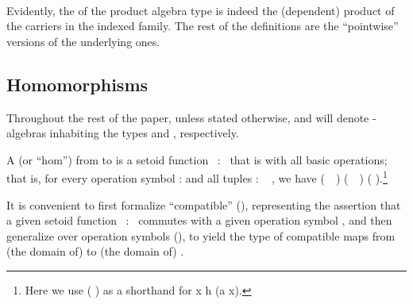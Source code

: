 \begin{code}
\AgdaSymbol{))}\AgdaSpace{}%
\AgdaSymbol{(}\AgdaSpace{}%
\AgdaOperator{\AgdaInductiveConstructor{,}}\AgdaSpace{}%
\AgdaSpace{}%
\AgdaSymbol{)}\AgdaSpace{}%
\AgdaSymbol{=}\AgdaSpace{}%
\AgdaSpace{}%
\AgdaSpace{}%
\AgdaSpace{}%
\AgdaSpace{}%
\AgdaSymbol{(}\AgdaSpace{}%
\AgdaSymbol{(}\AgdaSpace{}%
\AgdaSymbol{))}\AgdaSpace{}%
\AgdaSymbol{(}\AgdaSpace{}%
\AgdaOperator{\AgdaInductiveConstructor{,}}\AgdaSpace{}%
\AgdaSpace{}%
\AgdaSpace{}%
\AgdaSpace{}%
\AgdaSymbol{)}\<%
\\
\>[0]\<%
\end{code}
\noindent Evidently, the  of the product algebra type is indeed the (dependent)
product of the carriers in the indexed family. The rest of the definitions are the ``pointwise''
versions of the underlying ones.

\subsection{Homomorphisms}\label{homomorphisms}
Throughout the rest of the paper, unless stated otherwise,  and 
will denote -algebras inhabiting the types    and
  , respectively.

A  (or ``hom'') from
 to  is a setoid function ~:~  
that is  with all basic operations; that is, for
every operation symbol  :  and all tuples
 : ~  , we have  
(~~)  
(~~)   ( \au{}).\footnote{Here we use
  ( \au{}) as a shorthand for
 \ab x  \ab h  (\ab a \ab x).}

It is convenient to first formalize ``compatible'' (),
representing the assertion that a given setoid function
~:~   commutes with a given
operation symbol , and then generalize over operation symbols (),
to yield the type of compatible maps from (the domain of)  to (the domain of) .

